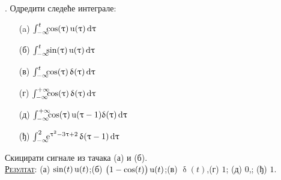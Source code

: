 \noindent
\textbf{\ID}. Одредити следеће интеграле: 
\begin{multicols}{3}
\begin{enumerate}
\item[(a)] $\int_{-\infty}^t \hspace*{-0.5em}
\cos (\uptau)\,{\rm u}(\uptau)\,{\rm d}\uptau$
\item[(б)] $\int_{-\infty}^t \hspace*{-0.5em}
\sin (\uptau)\,{\rm u}(\uptau)\,{\rm d}\uptau$
\item[(в)] $\int_{-\infty}^t \hspace*{-0.5em}
\cos (\uptau)\,\updelta(\uptau)\,{\rm d}\uptau$
\item[(г)] $\int_{-\infty}^{+\infty} \hspace*{-0.5em}
\cos (\uptau)\,\updelta(\uptau)\,{\rm d}\uptau$
\item[(д)] $\int_{-\infty}^{+\infty} \hspace*{-0.5em}
\cos (\uptau)\,{\rm u}(\uptau-1)\updelta(\uptau)\,{\rm d}\uptau$
\item[(ђ)] $\int_{-\infty}^{2}
 \hspace*{-0.5em}
{\rm e}^{\uptau^2 - 3\uptau + 2} \, \updelta(\uptau-1) \,{\rm d}\uptau$
\end{enumerate}
\end{multicols}
\noindent
Скицирати сигнале из тачака (а) и (б).
\\[2mm]

\textsc{\underline{Резултат}}:
(а) $\sin(t)\,{\rm u}(t)$;\hfill (б) $\bigl(1 - \cos(t)\bigr)\,{\rm u}(t)$;\hfill (в) $\updelta (t)$,\hfill (г) $1$;\hfill 
(д) $0$,\hfill; (ђ) $1$.
